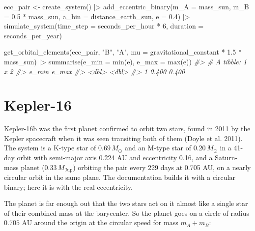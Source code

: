 \documentclass[
  10.5pt,
  letterpaper,
]{scrbook}
\newenvironment{Shaded}{\begin{snugshade}}{\end{snugshade}}
\newcommand{\AttributeTok}[1]{\textcolor[rgb]{0.00,0.00,0.00}{#1}}
\newcommand{\CommentTok}[1]{\textcolor[rgb]{0.00,0.00,0.00}{\textit{#1}}}
\newcommand{\DecValTok}[1]{\textcolor[rgb]{0.00,0.00,0.00}{#1}}
\newcommand{\FloatTok}[1]{\textcolor[rgb]{0.00,0.00,0.00}{#1}}
\newcommand{\FunctionTok}[1]{\textcolor[rgb]{0.00,0.00,0.00}{#1}}
\newcommand{\NormalTok}[1]{\textcolor[rgb]{0.00,0.00,0.00}{#1}}
\newcommand{\OtherTok}[1]{\textcolor[rgb]{0.00,0.00,0.00}{#1}}
\newcommand{\SpecialCharTok}[1]{\textcolor[rgb]{0.00,0.00,0.00}{#1}}
\newcommand{\StringTok}[1]{\textcolor[rgb]{0.00,0.00,0.00}{#1}}
\theoremstyle{definition}
\theoremstyle{plain}
\theoremstyle{remark}
\begin{document}
\begin{Shaded}
\begin{Highlighting}[]
\NormalTok{ecc\_pair }\OtherTok{\textless{}{-}} \FunctionTok{create\_system}\NormalTok{() }\SpecialCharTok{|\textgreater{}}
  \FunctionTok{add\_eccentric\_binary}\NormalTok{(}\AttributeTok{m\_A =}\NormalTok{ mass\_sun, }\AttributeTok{m\_B =} \FloatTok{0.5} \SpecialCharTok{*}\NormalTok{ mass\_sun,}
                       \AttributeTok{a\_bin =}\NormalTok{ distance\_earth\_sun, }\AttributeTok{e =} \FloatTok{0.4}\NormalTok{) }\SpecialCharTok{|\textgreater{}}
  \FunctionTok{simulate\_system}\NormalTok{(}\AttributeTok{time\_step =}\NormalTok{ seconds\_per\_hour }\SpecialCharTok{*} \DecValTok{6}\NormalTok{, }\AttributeTok{duration =}\NormalTok{ seconds\_per\_year)}

\FunctionTok{get\_orbital\_elements}\NormalTok{(ecc\_pair, }\StringTok{"B"}\NormalTok{, }\StringTok{"A"}\NormalTok{, }\AttributeTok{mu =}\NormalTok{ gravitational\_constant }\SpecialCharTok{*} \FloatTok{1.5} \SpecialCharTok{*}\NormalTok{ mass\_sun) }\SpecialCharTok{|\textgreater{}}
  \FunctionTok{summarise}\NormalTok{(}\AttributeTok{e\_min =} \FunctionTok{min}\NormalTok{(e), }\AttributeTok{e\_max =} \FunctionTok{max}\NormalTok{(e))}
\CommentTok{\#\textgreater{} \# A tibble: 1 x 2}
\CommentTok{\#\textgreater{}   e\_min e\_max}
\CommentTok{\#\textgreater{}   \textless{}dbl\textgreater{} \textless{}dbl\textgreater{}}
\CommentTok{\#\textgreater{} 1 0.400 0.400}
\end{Highlighting}
\end{Shaded}

\section{Kepler-16}\label{kepler-16}

Kepler-16b was the first planet confirmed to orbit two stars, found in
2011 by the Kepler spacecraft when it was seen transiting both of them
({Doyle et al.} 2011). The system is a K-type star of \(0.69\,M_\odot\)
and an M-type star of \(0.20\,M_\odot\) in a 41-day orbit with
semi-major axis 0.224 AU and eccentricity 0.16, and a Saturn-mass planet
(\(0.33\,M_{\mathrm{Jup}}\)) orbiting the pair every 229 days at 0.705
AU, on a nearly circular orbit in the same plane. The documentation
builds it with a circular binary; here it is with the real eccentricity.

The planet is far enough out that the two stars act on it almost like a
single star of their combined mass at the barycenter. So the planet goes
on a circle of radius \(0.705\) AU around the origin at the circular
speed for mass \(m_A + m_B\):
\end{document}
